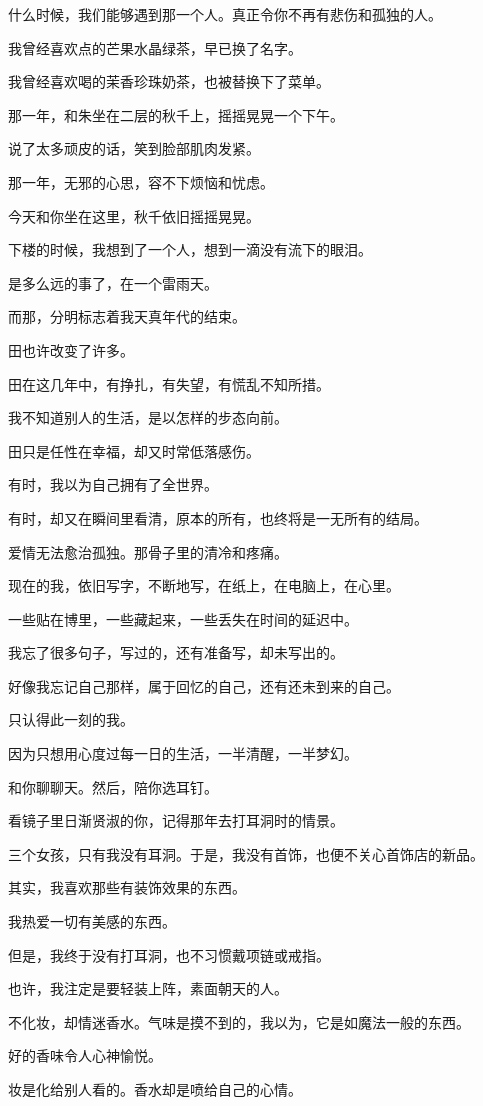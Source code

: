 \documentclass[12pt,a4paper]{article}
\begin{document}
		什么时候，我们能够遇到那一个人。真正令你不再有悲伤和孤独的人。

		我曾经喜欢点的芒果水晶绿茶，早已换了名字。\par
		我曾经喜欢喝的茉香珍珠奶茶，也被替换下了菜单。\par
		那一年，和朱坐在二层的秋千上，摇摇晃晃一个下午。\par
		说了太多顽皮的话，笑到脸部肌肉发紧。\par
		那一年，无邪的心思，容不下烦恼和忧虑。\par
		今天和你坐在这里，秋千依旧摇摇晃晃。\par
		下楼的时候，我想到了一个人，想到一滴没有流下的眼泪。\par
		是多么远的事了，在一个雷雨天。\par
		而那，分明标志着我天真年代的结束。

		田也许改变了许多。\par
		田在这几年中，有挣扎，有失望，有慌乱不知所措。\par
		我不知道别人的生活，是以怎样的步态向前。\par
		田只是任性在幸福，却又时常低落感伤。\par
		有时，我以为自己拥有了全世界。\par
		有时，却又在瞬间里看清，原本的所有，也终将是一无所有的结局。\par
		爱情无法愈治孤独。那骨子里的清冷和疼痛。\par
		现在的我，依旧写字，不断地写，在纸上，在电脑上，在心里。\par
		一些贴在博里，一些藏起来，一些丢失在时间的延迟中。\par
		我忘了很多句子，写过的，还有准备写，却未写出的。\par
		好像我忘记自己那样，属于回忆的自己，还有还未到来的自己。\par
		只认得此一刻的我。\par
		因为只想用心度过每一日的生活，一半清醒，一半梦幻。

		和你聊聊天。然后，陪你选耳钉。\par
		看镜子里日渐贤淑的你，记得那年去打耳洞时的情景。\par
		三个女孩，只有我没有耳洞。于是，我没有首饰，也便不关心首饰店的新品。\par
		其实，我喜欢那些有装饰效果的东西。\par
		我热爱一切有美感的东西。\par
		但是，我终于没有打耳洞，也不习惯戴项链或戒指。\par
		也许，我注定是要轻装上阵，素面朝天的人。\par
		不化妆，却情迷香水。气味是摸不到的，我以为，它是如魔法一般的东西。\par
		好的香味令人心神愉悦。\par
		妆是化给别人看的。香水却是喷给自己的心情。
\end{document}
